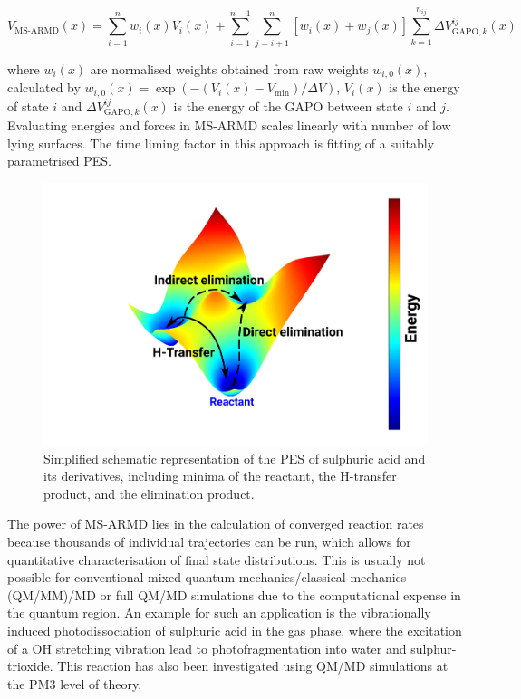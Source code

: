 \documentclass[journal=jacsat,manuscript=article]{achemso}
\begin{document}
\begin{equation}
  V_{\text{MS-ARMD}}(x) =\sum_{i=1}^n w_i(x)V_i(x) + \sum_{i=1}^{n-1} \sum_{j=i+1}^n [w_i(x)+w_j(x)]  \sum_{k=1}^{n_{ij}} \Delta V_{\text{GAPO},k}^{ij} (x)
  \label{eq:msarmd}
\end{equation}

\noindent
where $w_i(x)$ are normalised weights obtained from raw weights
$w_{i,0}(x)$, calculated by $w_{i,0}(x) = \exp (- (V_i(x) -
V_{\text{min}})/ \Delta V)$, $V_i(x)$ is the energy of state $i$ and
$\Delta V_{\text{GAPO},k}^{ij} (x)$ is the energy of the GAPO between
state $i$ and $j$. Evaluating energies and forces in MS-ARMD scales
linearly with number of low lying surfaces. The time liming factor in
this approach is fitting of a suitably parametrised PES.\\

\begin{figure}
\includegraphics[width=\textwidth]{fig/msarmd-sulphonics.png}
\caption{Simplified schematic representation of the PES of sulphuric
  acid and its derivatives, including minima of the reactant, the
  H-transfer product, and the elimination product.}
	\label{fig:msarmdsulphonic}
\end{figure}

\noindent
The power of MS-ARMD lies in the calculation of converged reaction
rates because thousands of individual trajectories can be run, which
allows for quantitative characterisation of final state
distributions. This is usually not possible for conventional mixed
quantum mechanics/classical mechanics (QM/MM)/MD or full QM/MD
simulations due to the computational expense in the quantum region. An
example for such an application is the vibrationally induced
photodissociation of sulphuric acid in the gas phase, where the
excitation of a OH stretching vibration lead to photofragmentation
into water and sulphur-trioxide\cite{reyes.pccp.2014.msarmd}. This
reaction has also been investigated using QM/MD simulations at the PM3
level of theory.\cite{Miller:2006}\\
\end{document}
